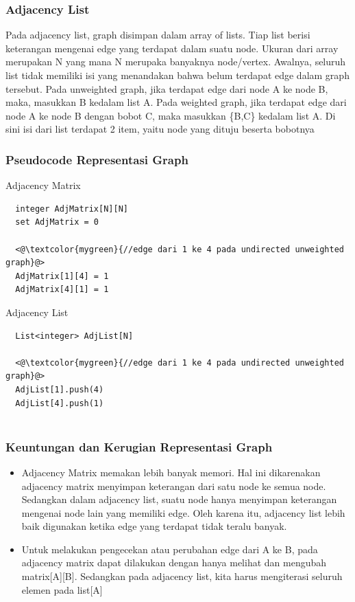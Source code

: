 \begin{frame}
\frametitle{Adjacency List}

Pada adjacency list, graph disimpan dalam array of lists. Tiap list berisi keterangan mengenai edge yang terdapat dalam suatu node. Ukuran dari array merupakan N yang mana N merupaka banyaknya node/vertex. \newline\newline
Awalnya, seluruh list tidak memiliki isi yang menandakan bahwa belum terdapat edge dalam graph tersebut. Pada unweighted graph, jika terdapat edge dari node A ke node B, maka, masukkan B kedalam list A. Pada weighted graph, jika terdapat edge dari node A ke node B dengan bobot C, maka masukkan \{B,C\} kedalam list A. Di sini isi dari list terdapat 2 item, yaitu node yang dituju beserta bobotnya
\end{frame}


\begin{frame}[fragile]
\frametitle{Pseudocode Representasi Graph}

Adjacency Matrix
\begin{lstlisting}
  integer AdjMatrix[N][N]
  set AdjMatrix = 0
  
  <@\textcolor{mygreen}{//edge dari 1 ke 4 pada undirected unweighted graph}@>
  AdjMatrix[1][4] = 1
  AdjMatrix[4][1] = 1
\end{lstlisting}
Adjacency List
\begin{lstlisting}
  List<integer> AdjList[N]
  
  <@\textcolor{mygreen}{//edge dari 1 ke 4 pada undirected unweighted graph}@>
  AdjList[1].push(4)
  AdjList[4].push(1)
  
\end{lstlisting}
\end{frame}

\begin{frame}
\frametitle{Keuntungan dan Kerugian Representasi Graph}

\begin{itemize}
  \item Adjacency Matrix memakan lebih banyak memori. Hal ini dikarenakan adjacency matrix menyimpan keterangan dari satu node ke semua node. Sedangkan dalam adjacency list, suatu node hanya menyimpan keterangan mengenai node lain yang memiliki edge. Oleh karena itu, adjacency list lebih baik digunakan ketika edge yang terdapat tidak teralu banyak.
  \item Untuk melakukan pengecekan atau perubahan edge dari A ke B, pada adjacency matrix dapat dilakukan dengan hanya melihat dan mengubah matrix[A][B]. Sedangkan pada adjacency list, kita harus mengiterasi seluruh elemen pada list[A]
\end{itemize}
\end{frame}

